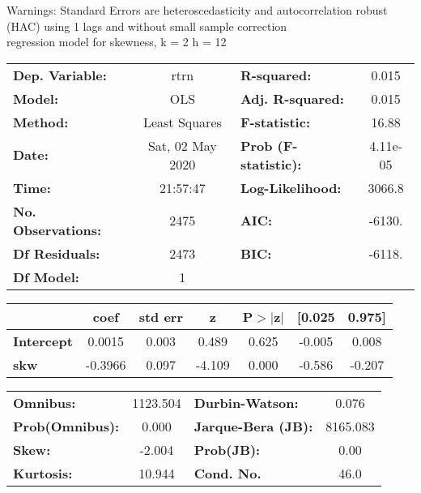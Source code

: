 Warnings: \newline
 [1] Standard Errors are heteroscedasticity and autocorrelation robust (HAC) using 1 lags and without small sample correction\\ 

regression model for skewness, k = 2 h = 12\begin{center}
\begin{tabular}{lclc}
\toprule
\textbf{Dep. Variable:}    &       rtrn       & \textbf{  R-squared:         } &     0.015   \\
\textbf{Model:}            &       OLS        & \textbf{  Adj. R-squared:    } &     0.015   \\
\textbf{Method:}           &  Least Squares   & \textbf{  F-statistic:       } &     16.88   \\
\textbf{Date:}             & Sat, 02 May 2020 & \textbf{  Prob (F-statistic):} &  4.11e-05   \\
\textbf{Time:}             &     21:57:47     & \textbf{  Log-Likelihood:    } &    3066.8   \\
\textbf{No. Observations:} &        2475      & \textbf{  AIC:               } &    -6130.   \\
\textbf{Df Residuals:}     &        2473      & \textbf{  BIC:               } &    -6118.   \\
\textbf{Df Model:}         &           1      & \textbf{                     } &             \\
\bottomrule
\end{tabular}
\begin{tabular}{lcccccc}
                   & \textbf{coef} & \textbf{std err} & \textbf{z} & \textbf{P$> |$z$|$} & \textbf{[0.025} & \textbf{0.975]}  \\
\midrule
\textbf{Intercept} &       0.0015  &        0.003     &     0.489  &         0.625        &       -0.005    &        0.008     \\
\textbf{skw}       &      -0.3966  &        0.097     &    -4.109  &         0.000        &       -0.586    &       -0.207     \\
\bottomrule
\end{tabular}
\begin{tabular}{lclc}
\textbf{Omnibus:}       & 1123.504 & \textbf{  Durbin-Watson:     } &    0.076  \\
\textbf{Prob(Omnibus):} &   0.000  & \textbf{  Jarque-Bera (JB):  } & 8165.083  \\
\textbf{Skew:}          &  -2.004  & \textbf{  Prob(JB):          } &     0.00  \\
\textbf{Kurtosis:}      &  10.944  & \textbf{  Cond. No.          } &     46.0  \\
\bottomrule
\end{tabular}
\end{center}

